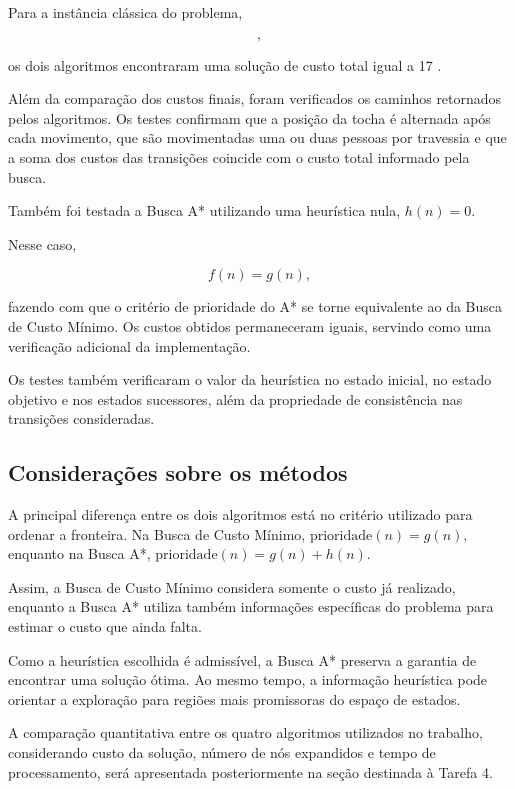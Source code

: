 Para a instância clássica do problema,

\begin{equation}
	[1,2,5,10],
\end{equation}

os dois algoritmos encontraram uma solução de custo total igual a 17 .

Além da comparação dos custos finais, foram verificados os caminhos retornados
pelos algoritmos. Os testes confirmam que a posição da tocha é alternada após
cada movimento, que são movimentadas uma ou duas pessoas por travessia e que a
soma dos custos das transições coincide com o custo total informado pela
busca.

Também foi testada a Busca A* utilizando uma heurística nula, $h(n)=0$.

Nesse caso,

\begin{equation}
	f(n)=g(n),
\end{equation}

fazendo com que o critério de prioridade do A* se torne equivalente ao da
Busca de Custo Mínimo. Os custos obtidos permaneceram iguais, servindo como
uma verificação adicional da implementação.

Os testes também verificaram o valor da heurística no estado inicial, no estado
objetivo e nos estados sucessores, além da propriedade de consistência nas
transições consideradas.

\subsection{Considerações sobre os métodos}

A principal diferença entre os dois algoritmos está no critério utilizado para
ordenar a fronteira.
Na Busca de Custo Mínimo, $\text{prioridade}(n)=g(n)$,
enquanto na Busca A*, $\text{prioridade}(n)=g(n)+h(n)$.

Assim, a Busca de Custo Mínimo considera somente o custo já realizado, enquanto
a Busca A* utiliza também informações específicas do problema para estimar o
custo que ainda falta.

Como a heurística escolhida é admissível, a Busca A* preserva a garantia de
encontrar uma solução ótima. Ao mesmo tempo, a informação heurística pode
orientar a exploração para regiões mais promissoras do espaço de estados.

A comparação quantitativa entre os quatro algoritmos utilizados no trabalho,
considerando custo da solução, número de nós expandidos e tempo de
processamento, será apresentada posteriormente na seção destinada à Tarefa 4.

